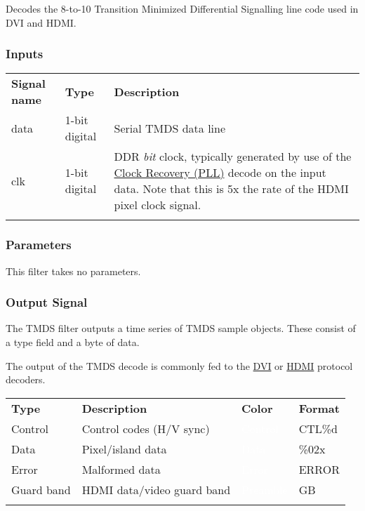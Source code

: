 Decodes the 8-to-10 Transition Minimized Differential Signalling line code used in DVI and HDMI.

\subsubsection{Inputs}

\begin{tabularx}{16cm}{llX}
\thickhline
\textbf{Signal name} & \textbf{Type} & \textbf{Description} \\
\thickhline
data & 1-bit digital & Serial TMDS data line \\
\thickhline
clk & 1-bit digital & DDR \emph{bit} clock, typically generated by use of the \hyperref[filter:cdrpll]{Clock Recovery
(PLL)} decode on the input data. Note that this is 5x the rate of the HDMI pixel clock signal. \\
\thickhline
\end{tabularx}

\subsubsection{Parameters}

This filter takes no parameters.

\subsubsection{Output Signal}

The TMDS filter outputs a time series of TMDS sample objects. These consist of a type field and a byte of data.

The output of the TMDS decode is commonly fed to the \hyperref[filter:dvi]{DVI} or \hyperref[filter:hdmi]{HDMI}
protocol decoders.

\begin{tabularx}{16cm}{lllX}
\thickhline
\textbf{Type} & \textbf{Description} & \textbf{Color} & \textbf{Format} \\
\thickhline
Control & Control codes (H/V sync) & \cellcolor{control}\textcolor{white}{Control} & CTL\%d \\
\thickhline
Data & Pixel/island data & \cellcolor{data}\textcolor{white}{Data} & \%02x \\
\thickhline
Error & Malformed data & \cellcolor{error}\textcolor{white}{Error} & ERROR \\
\thickhline
Guard band & HDMI data/video guard band & \cellcolor{preamble}\textcolor{white}{Preamble} & GB \\
\thickhline
\end{tabularx}

